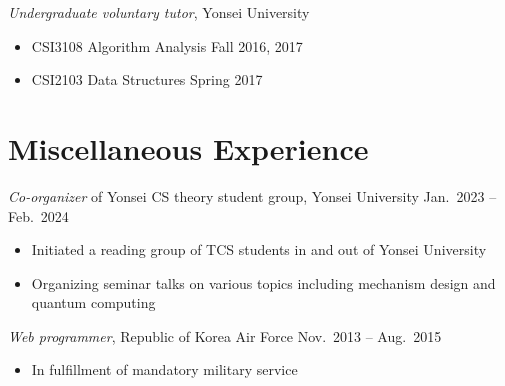 \documentclass{article}
\newcommand{\killinitspace}{-0.7em}
\begin{document}
\textsl{Undergraduate voluntary tutor}, Yonsei University
\vspace{\killinitspace}
\begin{itemize}
\item CSI3108 Algorithm Analysis \hfill Fall 2016, 2017
\item CSI2103 Data Structures \hfill Spring 2017
\end{itemize}


\section{Miscellaneous Experience}
\textsl{Co-organizer} of Yonsei CS theory student group, Yonsei University \hfill Jan.~2023 -- Feb.~2024
\vspace{\killinitspace}
\begin{itemize}
\item Initiated a reading group of TCS students in and out of Yonsei University
\item Organizing seminar talks on various topics including mechanism design and quantum computing
\end{itemize}

\textsl{Web programmer}, Republic of Korea Air Force \hfill Nov.~2013 -- Aug.~2015
\vspace{\killinitspace}
\begin{itemize}
\item In fulfillment of mandatory military service
\end{itemize}
\end{document}
